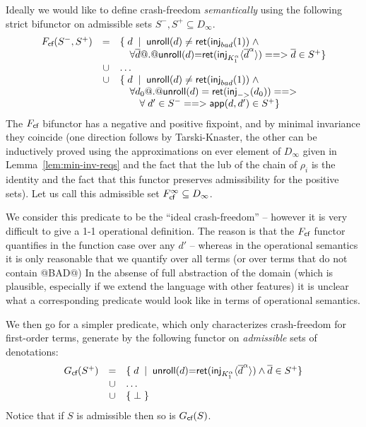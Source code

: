 \documentclass[preprint,nocopyrightspace,draft]{sigplanconf}
\begin{document}
Ideally we would like to define crash-freedom {\em semantically} using the following 
strict bifunctor on admissible sets $S^{-},S^{+} \subseteq D_{\infty}$.
{\setlength{\arraycolsep}{2pt}
\[\begin{array}{rcl}
   F_{\textsf{cf}}(S^{-},S^{+}) & = & \{\;d\;\mid\;\mathsf{unroll}(d) \neq \mathsf{ret}(\mathsf{inj}_{bad}(1))\;\land\; \\ 
                      &    & \quad \forall \overline{d} @.@ \mathsf{unroll}(d){=}\mathsf{ret}(\mathsf{inj}_{K_1^\alpha}\langle\overline{d}^{\alpha}\rangle) ==> \overline{d} \in S^{+} \} \\ 
                   & \cup & \ldots \\ 
                   & \cup & \{\;d\;\mid\;\mathsf{unroll}(d) \neq \mathsf{ret}(\mathsf{inj}_{bad}(1))\;\land\; \\ 
                   &      & \quad \forall d_0 @.@ \mathsf{unroll}(d) = \mathsf{ret}(\mathsf{inj}_{->}(d_0)) ==> \\ 
                   &      & \quad\quad \forall\;d' \in S^{-} ==> \mathsf{app}(d,d') \in S^{+} \}  \\
\end{array}\]}
The $F_{\textsf{cf}}$ bifunctor has a negative and positive fixpoint, and by minimal invariance they coincide (one direction 
follows by Tarski-Knaster, the other can be inductively proved using the approximations on ever element of $D_{\infty}$ given
in Lemma~\ref{lem:min-inv-reqs} and the fact that the lub of the chain of $\rho_i$ is the identity and the fact that this 
functor preserves admissibility for the positive sets). Let us call this admissible set $F_{\textsf{cf}}^{\infty} \subseteq D_{\infty}$.

We consider this predicate to be the ``ideal crash-freedom'' -- however it is very difficult to give a 1-1 operational
definition. The reason is that the $F_{\textsf{cf}}$ functor quantifies in the function case over any $d'$ -- whereas in the operational
semantics it is only reasonable that we quantify over all terms (or over terms that do not contain @BAD@) In the absense of 
full abstraction of the domain (which is plausible, especially if we extend the language with other features) it is unclear 
what a corresponding predicate would look like in terms of operational semantics. 

We then go for a simpler predicate, which only characterizes crash-freedom for first-order terms, 
generate by the following functor on {\em admissible} sets of denotations:
{\setlength{\arraycolsep}{2pt}
\[\begin{array}{rcl}
   G_{\textsf{cf}}(S^{+}) & = & \{\;d\;\mid\; \mathsf{unroll}(d){=}\mathsf{ret}(\mathsf{inj}_{K_1^\alpha}\langle\overline{d}^{\alpha}\rangle) \land \overline{d} \in S^{+} \} \\ 
                  & \cup & \ldots \\ 
                  & \cup & \{\;\bot\;\}
\end{array}\]}
Notice that if $S$ is admissible then so is $G_{\textsf{cf}}(S)$. 
\end{document}
